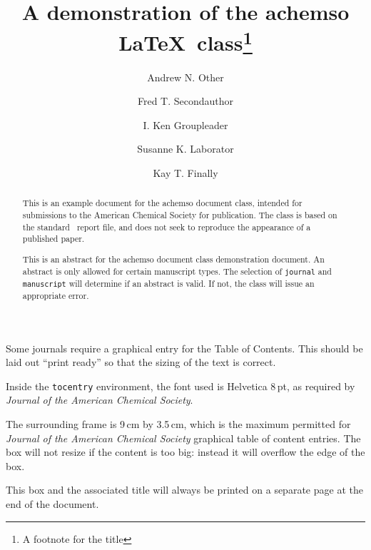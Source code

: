 \documentclass[journal=jacsat,manuscript=article]{achemso}
\author{Andrew N. Other}
\author{Fred T. Secondauthor}
\author{I. Ken Groupleader}
\affiliation[Unknown University]
{Department of Chemistry, Unknown University, Unknown Town}
\author{Susanne K. Laborator}
\affiliation[BigPharma]
{Lead Discovery, BigPharma, Big Town, USA}
\author{Kay T. Finally}
\affiliation[Unknown University]
{Department of Chemistry, Unknown University, Unknown Town}
\title[An \textsf{achemso} demo] 
  {A demonstration of the \textsf{achemso} \LaTeX\
   class\footnote{A footnote for the title}}
\begin{document}
\begin{tocentry}

Some journals require a graphical entry for the Table of Contents.
This should be laid out ``print ready'' so that the sizing of the
text is correct.

Inside the \texttt{tocentry} environment, the font used is Helvetica
8\,pt, as required by \emph{Journal of the American Chemical
Society}.

The surrounding frame is 9\,cm by 3.5\,cm, which is the maximum
permitted for  \emph{Journal of the American Chemical Society}
graphical table of content entries. The box will not resize if the
content is too big: instead it will overflow the edge of the box.

This box and the associated title will always be printed on a
separate page at the end of the document.

\end{tocentry}

\begin{abstract}
  This is an example document for the \textsf{achemso} document
  class, intended for submissions to the American Chemical Society
  for publication. The class is based on the standard \LaTeXe\
  \textsf{report} file, and does not seek to reproduce the appearance
  of a published paper.

  This is an abstract for the \textsf{achemso} document class
  demonstration document.  An abstract is only allowed for certain
  manuscript types.  The selection of \texttt{journal} and
  \texttt{manuscript} will determine if an abstract is valid.  If
  not, the class will issue an appropriate error.
\end{abstract}

\end{document}
